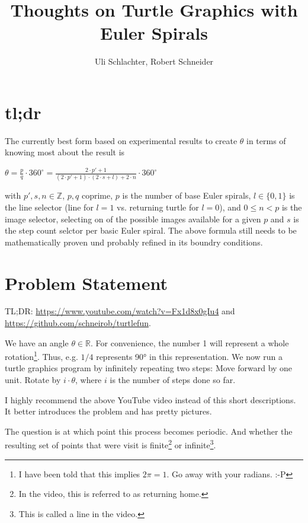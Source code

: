 \documentclass[pdftex,a4paper]{scrartcl}
\title{Thoughts on Turtle Graphics with Euler Spirals}
\author{Uli Schlachter, Robert Schneider}
\begin{document}
\maketitle

\section*{tl;dr}

The currently best form based on experimental results to create $\theta$ in terms of knowing most about the result is 

$\theta = \frac{p}{q} \cdot 360^{\circ} = \frac{2\cdot p' + 1}{(2\cdot p' + 1) \cdot (2 \cdot s + l) + 2 \cdot n} \cdot 360^{\circ}$

with $p', s, n \in \mathbb{Z}$, $p, q$ coprime, $p$ is the number of base Euler spirals, $l \in \{0, 1\}$ is the line
selector (line for $l = 1$ vs. returning turtle for $l = 0$), and $0 \leq n < p$ is the image selector, selecting on of
the possible images available for a given $p$ and $s$ is the step count selctor per basic Euler spiral. The above
formula still needs to be mathematically proven und probably refined in its boundry conditions.

\section{Problem Statement}
TL;DR: \url{https://www.youtube.com/watch?v=Fx1d8x0gIu4} and \url{https://github.com/schneirob/turtlefun}.

We have an angle \(\theta\in\mathbb{R}\). For convenience, the number 1 will represent a whole rotation\footnote{I have
been told that this implies \(2\pi = 1\). Go away with your radians. :-P}. Thus, e.g. \(1/4\) represents 90° in this
representation. We now run a turtle graphics program by infinitely repeating two steps: Move forward by one unit. Rotate
by \(i\cdot\theta\), where \(i\) is the number of steps done so far.

I highly recommend the above YouTube video instead of this short descriptions. It better introduces the problem and has
pretty pictures.

The question is at which point this process becomes periodic. And whether the resulting set of points that were visit is
finite\footnote{In the video, this is referred to as returning home.} or infinite\footnote{This is called a line in the
video.}.
\end{document}
